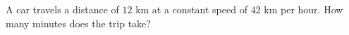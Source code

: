 A car travels a distance of $12$ km at a constant speed of $42$ km per hour. How many minutes does the trip take?
